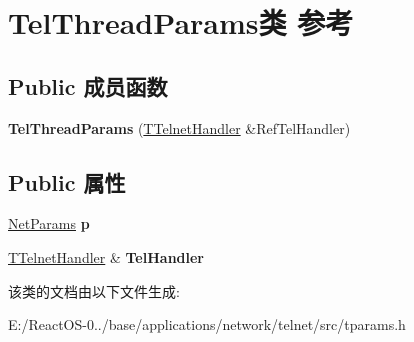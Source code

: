 \hypertarget{class_tel_thread_params}{}\section{Tel\+Thread\+Params类 参考}
\label{class_tel_thread_params}
\subsection*{Public 成员函数}
\begin{DoxyCompactItemize}
\item 
\mbox{\label{class_tel_thread_params_a07fd6e2bebd26166ccb51eff2f199c54}} 
{\bfseries Tel\+Thread\+Params} (\hyperlink{class_t_telnet_handler}{T\+Telnet\+Handler} \&Ref\+Tel\+Handler)
\end{DoxyCompactItemize}
\subsection*{Public 属性}
\begin{DoxyCompactItemize}
\item 
\mbox{\label{class_tel_thread_params_aa33c0c7539e4cb2b4abc16d0851b758f}} 
\hyperlink{struct_net_params}{Net\+Params} {\bfseries p}
\item 
\mbox{\label{class_tel_thread_params_a407fa9f24655e479ecd9765c83b8b9bf}} 
\hyperlink{class_t_telnet_handler}{T\+Telnet\+Handler} \& {\bfseries Tel\+Handler}
\end{DoxyCompactItemize}


该类的文档由以下文件生成\+:\begin{DoxyCompactItemize}
\item 
E\+:/\+React\+O\+S-\/0../base/applications/network/telnet/src/tparams.\+h\end{DoxyCompactItemize}
